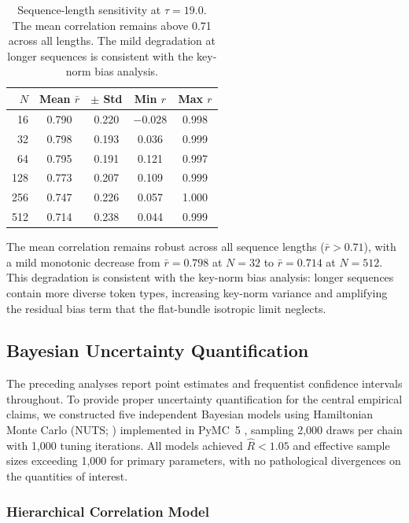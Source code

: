 \documentclass[twoside,11pt]{article}
\begin{document}
\begin{table}[h]
\centering
\renewcommand{\arraystretch}{1.15}
\begin{tabular}{rcccc}
\hline
$N$ & Mean $\bar{r}$ & $\pm$ Std & Min $r$ & Max $r$ \\
\hline
16  & 0.790 & 0.220 & $-0.028$ & 0.998 \\
32  & 0.798 & 0.193 & 0.036    & 0.999 \\
64  & 0.795 & 0.191 & 0.121    & 0.997 \\
128 & 0.773 & 0.207 & 0.109    & 0.999 \\
256 & 0.747 & 0.226 & 0.057    & 1.000 \\
512 & 0.714 & 0.238 & 0.044    & 0.999 \\
\hline
\end{tabular}
\caption{Sequence-length sensitivity at $\tau = 19.0$. The mean correlation remains above 0.71 across all lengths. The mild degradation at longer sequences is consistent with the key-norm bias analysis.}
\label{tab:seqlen_supp}
\end{table}

The mean correlation remains robust across all sequence lengths ($\bar{r} > 0.71$), with a mild monotonic decrease from $\bar{r} = 0.798$ at $N = 32$ to $\bar{r} = 0.714$ at $N = 512$. This degradation is consistent with the key-norm bias analysis: longer sequences contain more diverse token types, increasing key-norm variance and amplifying the residual bias term that the flat-bundle isotropic limit neglects.

\subsection{Bayesian Uncertainty Quantification}
\label{sec:bayesian_validation_supp}

The preceding analyses report point estimates and frequentist confidence intervals throughout. To provide proper uncertainty quantification for the central empirical claims, we constructed five independent Bayesian models using Hamiltonian Monte Carlo (NUTS; \citealp{hoffman2014no}) implemented in PyMC~5 \citep{salvatier2016probabilistic}, sampling 2{,}000 draws per chain with 1{,}000 tuning iterations. All models achieved $\hat{R} < 1.05$ and effective sample sizes exceeding 1{,}000 for primary parameters, with no pathological divergences on the quantities of interest.

\subsubsection{Hierarchical Correlation Model}
\end{document}
